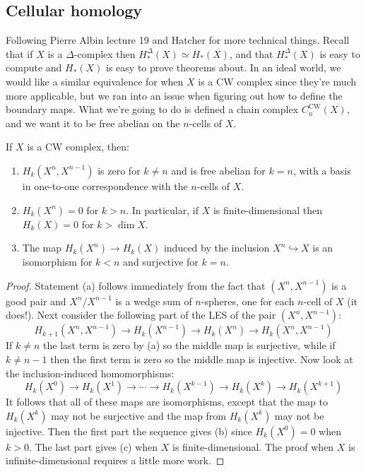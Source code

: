 \subsection{Cellular homology}
Following Pierre Albin lecture 19 and Hatcher for more technical things. Recall that if $X$ is a $\Delta $-complex then $H_*^{\Delta }(X)\simeq H_*(X)$, and that $H_*^{\Delta }(X)$ is easy to compute and $H_*(X)$ is easy to prove theorems about. In an ideal world, we would like a similar equivalence for when $X$ is a CW complex since they're much more applicable, but we ran into an issue when figuring out how to define the boundary maps. 
What we're going to do is defined a chain complex $C_n ^{\text{CW}}(X)$, and we want it to be free abelian on the $n$-cells of $X$.
\begin{lemma}\label{cells}
    If $X$ is a CW complex, then:
    \begin{enumerate}[label=(\alph*)]
        \item $H_k(X^n ,X^{n-1})$ is zero for $k\neq n$ and is free abelian for $k=n$, with a basis in one-to-one correspondence with the $n$-cells of $X$.
        \item $H_k(X^n )=0$ for $k>n$. In particular, if $X$ is finite-dimensional then $H_k(X)=0$ for $k>\operatorname{dim}X$.
        \item The map $H_k (X^n )\to H_k(X)$ induced by the inclusion $X^n \hookrightarrow X$ is an isomorphism for $k<n$ and surjective for $k=n$.
    \end{enumerate}
\end{lemma}
\begin{proof}
    Statement (a) follows immediately from the fact that $(X^n ,X^{n-1})$ is a good pair and $X^n  / X^{n-1}$ is a wedge sum of $n$-spheres, one for each $n$-cell of $X$ (it does!). Next consider the following part of the LES of the pair $(X^n ,X^{n-1})$: \[
        H_{k+1}(X^n ,X^{n-1})\to H_k(X^{n-1})\to H_k(X^n )\to H_k(X^n ,X^{n-1})
    \] If $k\neq n$ the last term is zero by (a) so the middle map is surjective, while if $k\neq n-1$ then the first term is zero so the middle map is injective. Now look at the inclusion-induced homomorphisms: \[
    H_k(X^0) \to H_k(X^1) \to \cdots \to H_k(X^{k-1}) \to H_k(X^k) \to H_k(X^{k+1})
\] It follows that all of these maps are isomorphisms, except that the map to $H_k(X^k)$ may not be surjective and the map from $H_k(X^k)$ may not be injective. Then the first part the sequence gives (b) since $H_k(X^0)=0$ when $k>0$. The last part gives (c) when $X$ is finite-dimensional. The proof when $X$ is infinite-dimensional requires a little more work.
\end{proof}

